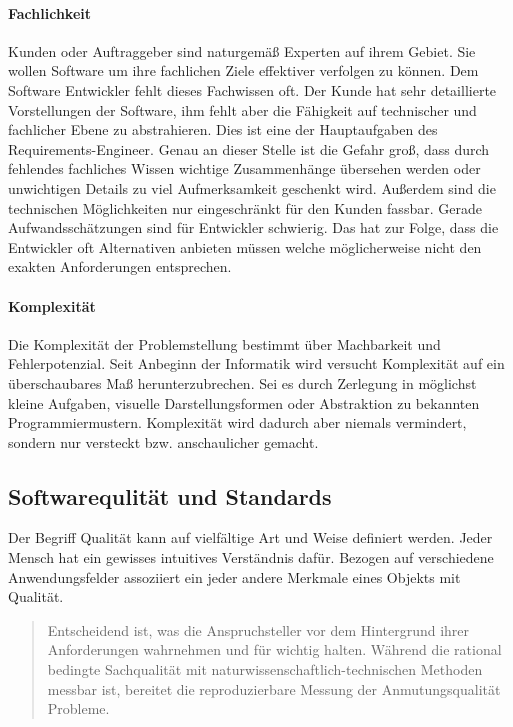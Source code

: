 \paragraph{Fachlichkeit}
Kunden oder Auftraggeber sind naturgemäß Experten auf ihrem Gebiet. Sie wollen Software um ihre fachlichen Ziele effektiver verfolgen zu können. Dem Software Entwickler fehlt dieses Fachwissen oft.
Der Kunde hat sehr detaillierte Vorstellungen der Software, ihm fehlt aber die Fähigkeit auf technischer und fachlicher Ebene zu abstrahieren. Dies ist eine der Hauptaufgaben des Requirements-Engineer. Genau an dieser Stelle ist die Gefahr groß, dass durch fehlendes fachliches Wissen wichtige Zusammenhänge übersehen werden oder unwichtigen Details zu viel Aufmerksamkeit geschenkt wird.
Außerdem sind die technischen Möglichkeiten nur eingeschränkt für den Kunden fassbar. Gerade Aufwandsschätzungen sind für Entwickler schwierig. Das hat zur Folge, dass die Entwickler oft Alternativen anbieten müssen welche möglicherweise nicht den exakten Anforderungen entsprechen.

\paragraph{Komplexität}
Die Komplexität der Problemstellung bestimmt über Machbarkeit und Fehlerpotenzial. Seit Anbeginn der Informatik wird versucht Komplexität auf ein überschaubares Maß herunterzubrechen. Sei es durch Zerlegung in möglichst kleine Aufgaben, visuelle Darstellungsformen oder Abstraktion zu bekannten Programmiermustern.
Komplexität wird dadurch aber niemals vermindert, sondern nur versteckt bzw. anschaulicher gemacht.


\subsection{Softwarequlität und Standards}
\label{sec:quality}
Der Begriff Qualität kann auf vielfältige Art und Weise definiert werden. Jeder Mensch hat ein gewisses intuitives Verständnis dafür. Bezogen auf verschiedene Anwendungsfelder assoziiert ein jeder andere Merkmale eines Objekts mit Qualität.

\begin{quote}
Entscheidend ist, was die Anspruchsteller vor dem Hintergrund ihrer Anforderungen wahrnehmen und für wichtig halten. Während die rational bedingte Sachqualität mit naturwissenschaftlich-technischen Methoden messbar ist, bereitet die reproduzierbare Messung der Anmutungsqualität Probleme\cite{markgraf_definition_2015}.
\end{quote}

